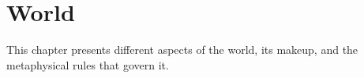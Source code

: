 \chapter{World}
This chapter presents different aspects of the world, its makeup, and the metaphysical rules that govern it.


